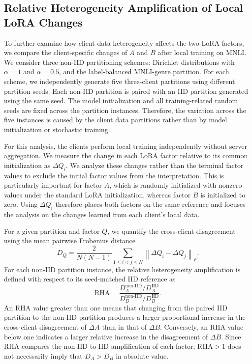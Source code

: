 \documentclass[lettersize,journal]{IEEEtran}
\begin{document}
		\subsection*{Relative Heterogeneity Amplification of Local LoRA Changes}
		{\color{black}To further examine how client data heterogeneity affects the two LoRA factors, we compare the client-specific changes of $A$ and $B$ after local training on MNLI. We consider three non-IID partitioning schemes: Dirichlet distributions with $\alpha=1$ and $\alpha=0.5$, and the label-balanced MNLI-genre partition. For each scheme, we independently generate five three-client partitions using different partition seeds. Each non-IID partition is paired with an IID partition generated using the same seed. The model initialization and all training-related random seeds are fixed across the partition instances. Therefore, the variation across the five instances is caused by the client data partitions rather than by model initialization or stochastic training.
			
			For this analysis, the clients perform local training independently without server aggregation. We measure the change in each LoRA factor relative to its common initialization as $\Delta Q_i$.
			We analyze these changes rather than the terminal factor values to exclude the initial factor values from the interpretation. This is particularly important for factor $A$, which is randomly initialized with nonzero values under the standard LoRA initialization, whereas factor $B$ is initialized to zero. Using $\Delta Q_i$ therefore places both factors on the same reference and focuses the analysis on the changes learned from each client's local data.
			
			For a given partition and factor $Q$, we quantify the cross-client disagreement using the mean pairwise Frobenius distance
			\begin{equation}
				D_Q
				=
				\frac{2}{N(N-1)}
				\sum_{1\leq i<j\leq N}
				\left\|
				\Delta Q_i-\Delta Q_j
				\right\|_F.
			\end{equation}
			For each non-IID partition instance, the relative heterogeneity amplification is defined with respect to its seed-matched IID reference as
			\begin{equation}
				\mathrm{RHA}
				=
				\frac{
					D_A^{\mathrm{non\text{-}IID}}/
					D_A^{\mathrm{IID}}
				}{
					D_B^{\mathrm{non\text{-}IID}}/
					D_B^{\mathrm{IID}}
				}.
			\end{equation}
			An RHA value greater than one means that changing from the paired IID partition to the non-IID partition produces a larger proportional increase in the cross-client disagreement of $\Delta A$ than in that of $\Delta B$. Conversely, an RHA value below one indicates a larger relative increase in the disagreement of $\Delta B$. Since RHA compares the non-IID-to-IID amplification of each factor, $\mathrm{RHA}>1$ does not necessarily imply that $D_A>D_B$ in absolute value.
			
}
\end{document}
